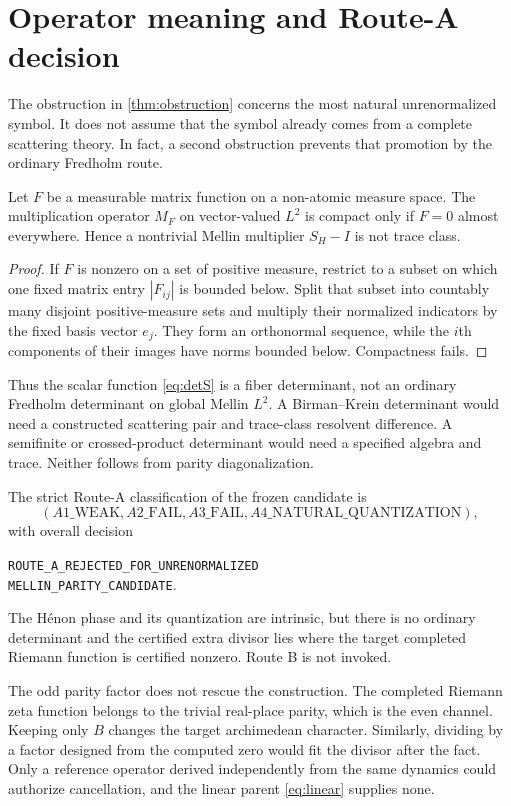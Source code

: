 \section{Operator meaning and Route-A decision}

The obstruction in \cref{thm:obstruction} concerns the most natural
unrenormalized symbol. It does not assume that the symbol already comes
from a complete scattering theory. In fact, a second obstruction prevents
that promotion by the ordinary Fredholm route.

\begin{proposition}[Multiplier no-go]\label{prop:multiplier}
Let $F$ be a measurable matrix function on a non-atomic measure space. The
multiplication operator $M_F$ on vector-valued $L^2$ is compact only if
$F=0$ almost everywhere. Hence a nontrivial Mellin multiplier $S_H-I$ is
not trace class.
\end{proposition}

\begin{proof}
If $F$ is nonzero on a set of positive measure, restrict to a subset on which
one fixed matrix entry $|F_{ij}|$ is bounded below. Split that subset into
countably many disjoint positive-measure sets and multiply their normalized
indicators by the fixed basis vector $e_j$. They form an orthonormal sequence,
while the $i$th components of their images have norms bounded below.
Compactness fails.
\end{proof}

Thus the scalar function \eqref{eq:detS} is a fiber determinant, not an
ordinary Fredholm determinant on global Mellin $L^2$. A Birman--Krein
determinant would need a constructed scattering pair and trace-class
resolvent difference. A semifinite or crossed-product determinant would
need a specified algebra and trace. Neither follows from parity
diagonalization.

The strict Route-A classification of the frozen candidate is
\begin{equation}\label{eq:route}
(A1\_\mathrm{WEAK},A2\_\mathrm{FAIL},A3\_\mathrm{FAIL},
A4\_\mathrm{NATURAL\_QUANTIZATION}),
\end{equation}
with overall decision
\begin{center}
\texttt{ROUTE\_A\_REJECTED\_FOR\_UNRENORMALIZED}\\[-2pt]
\texttt{MELLIN\_PARITY\_CANDIDATE}.
\end{center}
The H\'enon phase and its quantization are intrinsic, but there is no
ordinary determinant and the certified extra divisor lies where the target
completed Riemann function is certified nonzero. Route B is not invoked.

The odd parity factor does not rescue the construction. The completed
Riemann zeta function belongs to the trivial real-place parity, which is the
even channel. Keeping only $B$ changes the target archimedean character.
Similarly, dividing by a factor designed from the computed zero would fit
the divisor after the fact. Only a reference operator derived independently
from the same dynamics could authorize cancellation, and the linear parent
\eqref{eq:linear} supplies none.
